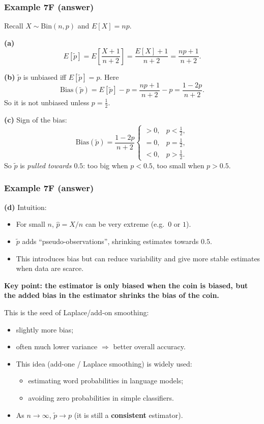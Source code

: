 \documentclass[t,8pt]{beamer}
\begin{document}
\begin{frame}
	\frametitle{Example 7F (answer)}
	
	Recall $X \sim \text{Bin}(n,p)$ and $E[X] = np$. \par
	
	{\bf (a)}
	\[
	E[\tilde p]
	= E\!\left[\frac{X+1}{n+2}\right]
	= \frac{E[X] + 1}{n+2}
	= \frac{np + 1}{n+2}.
	\]
	
	{\bf (b)} $\tilde p$ is unbiased iff $E[\tilde p] = p$. Here
	\[
	\text{Bias}(\tilde p)
	= E[\tilde p] - p
	= \frac{np+1}{n+2} - p
	= \frac{1 - 2p}{n+2}.
	\]
	So it is \alert{not} unbiased unless $p=\tfrac12$. \par
	{\bf (c)} Sign of the bias:
	\[
	\text{Bias}(\tilde p) = \frac{1-2p}{n+2}
	\begin{cases}
		> 0, & p < \tfrac12,\\[4pt]
		= 0, & p = \tfrac12,\\[4pt]
		< 0, & p > \tfrac12.
	\end{cases}
	\]
	So $\tilde p$ is \emph{pulled towards $0.5$}: too big when $p<0.5$, too small when $p>0.5$.
\end{frame}

\begin{frame}
	\frametitle{Example 7F (answer)}
	{\bf (d)} Intuition:
	\begin{itemize}
		\item For small $n$, $\hat p = X/n$ can be very extreme (e.g.\ $0$ or $1$).
		\item $\tilde p$ adds ``pseudo-observations'', shrinking estimates towards $0.5$.
		\item This introduces bias but can reduce variability and give more stable estimates
		when data are scarce.
	\end{itemize}
	{\bf Key point: the estimator is only biased when the coin is biased, but the added bias in the estimator shrinks the bias of the coin.} \par
	This is the seed of Laplace/add-on smoothing:
	\begin{itemize}
		\item slightly more \alert{bias};
		\item often much lower \alert{variance} $\Rightarrow$ better overall accuracy.
		\item This idea (add-one / Laplace smoothing) is widely used:
		\begin{itemize}
			\item estimating word probabilities in language models;
			\item avoiding zero probabilities in simple classifiers.
		\end{itemize}
		\item As $n \to \infty$, $\tilde p \to p$ (it is still a \textbf{consistent} estimator).
	\end{itemize}
\end{frame}
\end{document}
